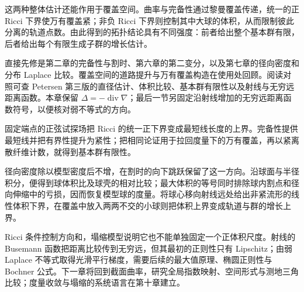 \ProseParagraphBreak

这两种整体估计还能作用于覆盖空间。曲率与完备性通过黎曼覆盖传递，统一的正 Ricci 下界使万有覆盖紧；非负 Ricci 下界则控制其中大球的体积，从而限制彼此分离的轨道点数。由此得到的拓扑结论具有不同强度：前者给出整个基本群有限，后者给出每个有限生成子群的增长估计。

\ProseParagraphBreak

直接先修是第二章的完备性与割时、第六章的第二变分，以及第七章的径向密度和分布 Laplace 比较。覆盖空间的道路提升与万有覆盖构造在使用处回顾。阅读对照可查 Petersen 第三版的直径估计、体积比较、基本群有限性以及射线与无穷远距离函数\cite[第6.3.1节，第7.1.2节，第7.2.1节，第7.3.1--7.3.2节]{Petersen2016}。本章保留 \(\Delta=-\operatorname{div}\nabla\)；最后一节另固定沿射线增加的无穷远距离函数符号，以便核对弱不等式的方向。






\begin{chaptersummary}
	固定端点的正弦试探场把 Ricci 的统一正下界变成最短线长度的上界。完备性提供最短线并把有界性提升为紧性；把相同论证用于拉回度量下的万有覆盖，再以紧离散纤维计数，就得到基本群有限性。

	\ProseParagraphBreak

	径向密度除以模型密度后不增，在割时的向下跳跃保留了这一方向。沿球面与半径积分，便得到球体积比及球壳的相对比较；最大体积的等号同时排除球内割点和径向伸缩中的亏损，因而恢复模型球的度量。将球心移向射线远处给出非紧流形的线性体积下界，在覆盖中放入两两不交的小球则把体积上界变成轨道与群的增长上界。

	\ProseParagraphBreak

	Ricci 条件控制方向和，塌缩模型说明它也不能单独固定一个正体积尺度。射线的 Busemann 函数把距离比较传到无穷远，但其最初的正则性只有 Lipschitz；由弱 Laplace 不等式取得光滑平行梯度，需要后续的最大值原理、椭圆正则性与 Bochner 公式。下一章将回到截面曲率，研究全局指数映射、空间形式与测地三角比较；度量收敛与塌缩的系统语言在第十章建立。
\end{chaptersummary}

\BookExercises


